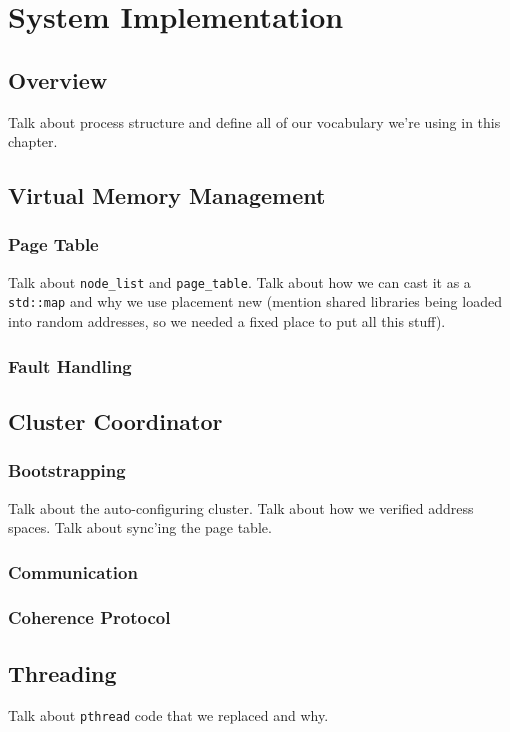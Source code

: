 \section{System Implementation}

\subsection{Overview}
Talk about process structure and define all of our vocabulary we're using in this chapter.

\subsection{Virtual Memory Management}
\subsubsection{Page Table}
Talk about \verb,node_list, and \verb,page_table,.  Talk about how we can cast it as a \verb,std::map, and why we use placement new (mention shared libraries being loaded into random addresses, so we needed a fixed place to put all this stuff).

\subsubsection{Fault Handling}

\subsection{Cluster Coordinator}

\subsubsection{Bootstrapping}
Talk about the auto-configuring cluster.  Talk about how we verified address spaces.  Talk about sync'ing the page table.

\subsubsection{Communication}
\subsubsection{Coherence Protocol}

\subsection{Threading}
Talk about \verb,pthread, code that we replaced and why.